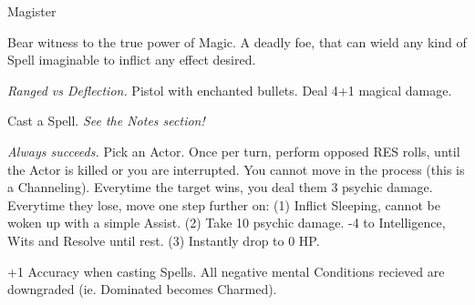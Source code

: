 \begin{monsterboxbg}{Magister}

    Bear witness to the true power of Magic. A deadly foe, that can wield any kind of Spell imaginable to inflict any effect desired.
    
    \rpghline
    \stats[
        STR = \stat{12}, 
        DEX = \stat{14},
        CON = \stat{16},
        INT = \stat{20},
        WIS = \stat{16},
        CHA = \stat{16},
    ]
    \rpghline

    \basics[
    armorclass = 1,
    hitpoints  = 70,
    focus      = 12,
    defenses   = {Deflection 5, Reflex 5, Fortitude 6, Will 8}
    ]
    \rpghline

    \details[%
    skills = {Crafting 2, Kosmics 5, Lore 2},
    challenge = Elite,
    accuracies = {Melee 4, Ranged 6},
    ]
    \rpghline%
    

    \begin{rpg-monsteraction}
        \textit{Ranged vs Deflection.} Pistol with enchanted bullets. Deal 4+1 magical damage.
    \end{rpg-monsteraction}

    \begin{rpg-monsteraction}
        Cast a Spell. \textit{See the Notes section!}
    \end{rpg-monsteraction}

    \begin{rpg-monsteraction}[Nightmare]
        \textit{Always succeeds.} Pick an Actor. Once per turn, perform opposed RES rolls, until the Actor is killed or you are interrupted. You cannot move in the process (this is a Channeling). Everytime the target wins, you deal them 3 psychic damage. Everytime they lose, move one step further on: (1) Inflict Sleeping, cannot be woken up with a simple Assist. (2) Take 10 psychic damage. -4 to Intelligence, Wits and Resolve until rest. (3) Instantly drop to 0 HP.
    \end{rpg-monsteraction}



    \begin{rpg-monsteraction}
        +1 Accuracy when casting Spells. All negative mental Conditions recieved are downgraded (ie. Dominated becomes Charmed).
    \end{rpg-monsteraction}


\end{monsterboxbg}
